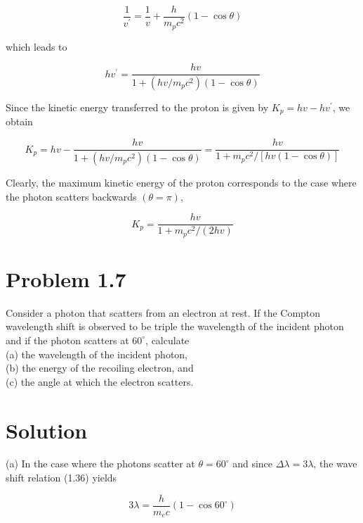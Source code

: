 \documentclass[10pt]{article}
\begin{document}
\begin{equation*}
\frac{1}{v^{\prime}}=\frac{1}{v}+\frac{h}{m_{p} c^{2}}(1-\cos \theta) \tag{1.182}
\end{equation*}


which leads to


\begin{equation*}
h v^{\prime}=\frac{h v}{1+\left(h v / m_{p} c^{2}\right)(1-\cos \theta)} \tag{1.183}
\end{equation*}


Since the kinetic energy transferred to the proton is given by $K_{p}=h v-h v^{\prime}$, we obtain


\begin{equation*}
K_{p}=h v-\frac{h v}{1+\left(h v / m_{p} c^{2}\right)(1-\cos \theta)}=\frac{h v}{1+m_{p} c^{2} /[h v(1-\cos \theta)]} \tag{1.184}
\end{equation*}


Clearly, the maximum kinetic energy of the proton corresponds to the case where the photon scatters backwards $(\theta=\pi)$,


\begin{equation*}
K_{p}=\frac{h v}{1+m_{p} c^{2} /(2 h v)} \tag{1.185}
\end{equation*}


\section*{Problem 1.7}
Consider a photon that scatters from an electron at rest. If the Compton wavelength shift is observed to be triple the wavelength of the incident photon and if the photon scatters at $60^{\circ}$, calculate\\
(a) the wavelength of the incident photon,\\
(b) the energy of the recoiling electron, and\\
(c) the angle at which the electron scatters.

\section*{Solution}
(a) In the case where the photons scatter at $\theta=60^{\circ}$ and since $\Delta \lambda=3 \lambda$, the wave shift relation (1.36) yields


\begin{equation*}
3 \lambda=\frac{h}{m_{e} c}\left(1-\cos 60^{\circ}\right) \tag{1.186}
\end{equation*}
\end{document}
